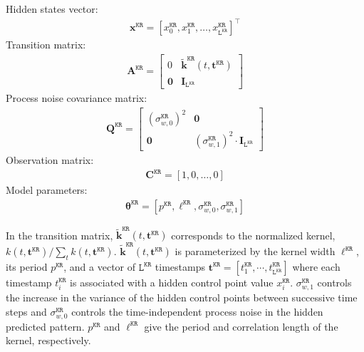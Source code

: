 Hidden states vector: 
\begin{gather*}
\mathbf{x}^{\mathtt{KR}} = [x^{\mathtt{KR}}_{0}, x^{\mathtt{KR}}_{1}, \dots, x^{\mathtt{KR}}_{\mathtt{L}^{\mathtt{KR}}}]^{\intercal}
\end{gather*}
Transition matrix: 
\begin{gather*}
\mathbf{A}^{\mathtt{KR}}= \left[\begin{array}{cc}0 &\tilde{\bm k}^{\mathtt{KR}}(t, \mathbf{t}^{\mathtt{KR}})\\\mathbf{0}&\mathbf{I}_{\mathtt{L}^{\mathtt{KR}}}\end{array}\right]
\end{gather*}
Process noise covariance matrix:
\begin{gather*}
\mathbf{Q}^{\mathtt{KR}}=\left[\begin{array}{cc}(\sigma_{w,0}^{\mathtt{KR}})^{2} &\mathbf{0}\\\mathbf{0}&(\sigma_{w,1}^{\mathtt{KR}})^{2}\cdot\mathbf{I}_{\mathtt{L}^{\mathtt{KR}} }\end{array}\right]
\end{gather*}
Observation matrix: 
\begin{gather*}
\mathbf{C}^{\mathtt{KR}}=[1, 0, \dots, 0]
\end{gather*}
Model parameters: 
\begin{gather*}
\bm\theta^{\mathtt{KR}}=[ p^{\mathtt{KR}},\ell^{\mathtt{KR}},  \sigma_{w,0}^{\mathtt{KR}}, \sigma_{w,1}^{\mathtt{KR}}]
\end{gather*}

\noindent
In the transition matrix, $\tilde{\bm k}^{\mathtt{KR}}(t,\mathbf{t}^{\mathtt{KR}})$ corresponds to the normalized kernel, $k(t,\mathbf{t}^{\mathtt{KR}})/\sum_{t} k(t,\mathbf{t}^{\mathtt{KR}})$. $\tilde{\bm k}^{\mathtt{KR}}(t,\mathbf{t}^{\mathtt{KR}})$ is parameterized by the kernel width $\ell^{\mathtt{KR}}$, its period $p^{\mathtt{KR}}$, and a vector of $\mathtt{L}^{\mathtt{KR}}$ timestamps $\mathbf{t}^{\mathtt{KR}}=[t_{1}^{\mathtt{KR}},\cdots,t_{\mathtt{L}^{\mathtt{KR}}}^{\mathtt{KR}}]$ where each timestamp $t_{i}^{\mathtt{KR}}$ is associated with a hidden control point value $x_{i}^{\mathtt{KR}}$. 
$\sigma_{w,1}^{\mathtt{KR}}$ controls the increase in the  variance of the hidden control points between successive time steps and $\sigma_{w,0}^{\mathtt{KR}}$ controls the time-independent process noise in the hidden predicted pattern.
$p^{\mathtt{KR}}$ and $\ell^{\mathtt{KR}}$ give the period and correlation length of the kernel, respectively.


